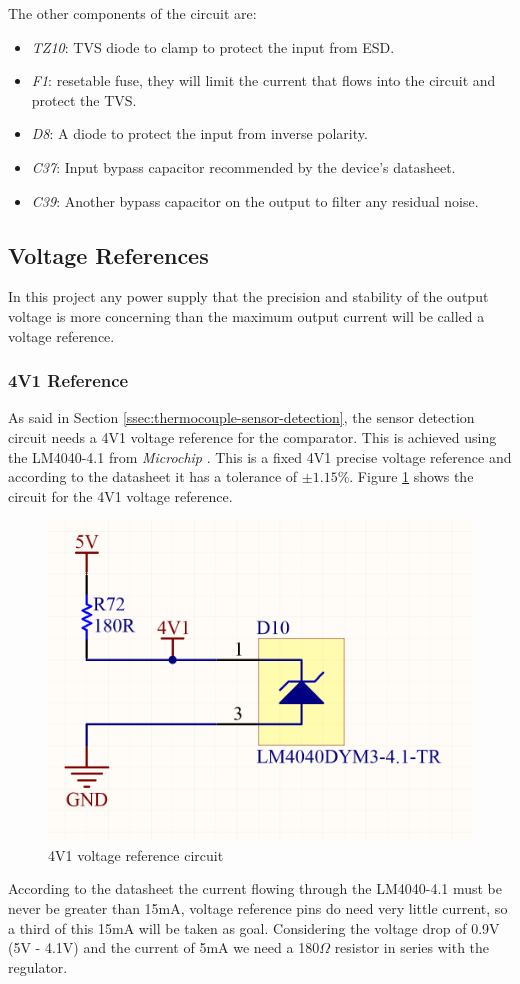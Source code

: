 			The other components of the circuit are:

			\begin{itemize}
				\item\textit{TZ10}: TVS diode to clamp to protect the input from ESD.
				\item\textit{F1}: resetable fuse, they will limit the current that flows into the circuit and protect the TVS.
				\item\textit{D8}: A diode to protect the input from inverse polarity.
				\item\textit{C37}: Input bypass capacitor recommended by the device's datasheet.
				\item\textit{C39}: Another bypass capacitor on the output to filter any residual noise.
			\end{itemize}

	\subsection{Voltage References}\label{ssec:voltage-references}

		In this project any power supply that the precision and stability of the output voltage is more concerning than the maximum output current will be called a voltage reference.

		\subsubsection{4V1 Reference}\label{sssec:4v1-reference}

			As said in Section \ref{ssec:thermocouple-sensor-detection}, the sensor detection circuit needs a 4V1 voltage reference for the comparator. This is achieved using the LM4040-4.1 from \textit{Microchip} \cite{lm4040-datasheet}. This is a fixed 4V1 precise voltage reference and according to the datasheet it has a tolerance of $\pm1.15\%$. Figure \ref{fig:4v1-voltage-ref} shows the circuit for the 4V1 voltage reference.

			\begin{figure}[htbp]
				\centering
					\includegraphics[width=.5\textwidth]{figuras/fig-4v1-voltage-ref}
				\caption{4V1 voltage reference circuit}
				\label{fig:4v1-voltage-ref}
			\end{figure}

			According to the datasheet the current flowing through the LM4040-4.1 must be never be greater than 15mA, voltage reference pins do need very little current, so a third of this 15mA will be taken as goal. Considering the voltage drop of 0.9V (5V - 4.1V) and the current of 5mA we need a 180$\Omega$ resistor in series with the regulator.